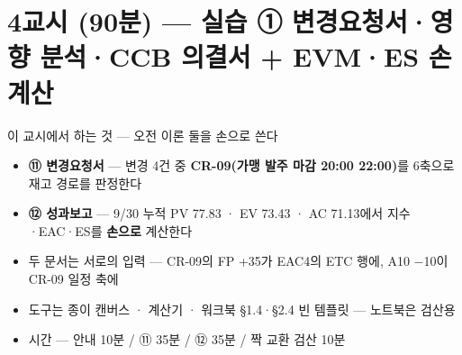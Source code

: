 \section{4교시 (90분) — 실습 ① 변경요청서·영향 분석·CCB 의결서 + EVM·ES 손계산}

\begin{frame}{이 교시에서 하는 것 — 오전 이론 둘을 손으로 쓴다}
\begin{itemize}
\item \textbf{⑪ 변경요청서} — 변경 4건 중 \textbf{CR-09(가맹 발주 마감 20:00 \ra{} 22:00)}를 6축으로 재고 경로를 판정한다
\item \textbf{⑫ 성과보고} — 9/30 누적 PV 77.83 · EV 73.43 · AC 71.13에서 지수·EAC·ES를 \textbf{손으로} 계산한다
\item 두 문서는 서로의 입력 — CR-09의 FP +35가 EAC4의 ETC 행에, A10 $-$10이 CR-09 일정 축에
\item 도구는 종이 캔버스 · 계산기 · 워크북 §1.4·§2.4 빈 템플릿 — 노트북은 검산용
\item 시간 — 안내 10분 / ⑪ 35분 / ⑫ 35분 / 짝 교환 검산 10분
\end{itemize}
\end{frame}

